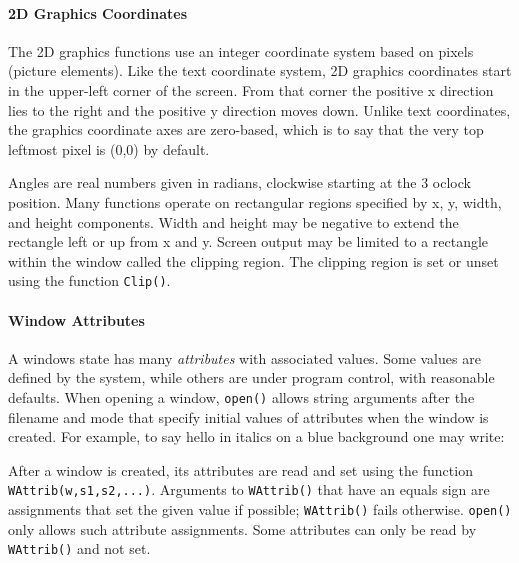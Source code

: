 \paragraph{2D Graphics Coordinates}

The 2D graphics functions use an integer coordinate system based on
pixels (picture elements). Like the text coordinate system, 2D
graphics coordinates start in the upper-left corner of the screen.
From that corner the positive x direction lies to the right and the
positive y direction moves down. Unlike text coordinates, the
graphics coordinate axes are zero-based, which is to say that the very
top leftmost pixel is (0,0) by default.

Angles are real numbers given in radians, clockwise starting at the 3
o{\textquotesingle}clock position. Many functions operate on
rectangular regions specified by x, y, width, and height components.
Width and height may be negative to extend the rectangle
left or up from x and y. Screen output may be limited to a
rectangle within the window called the clipping region. The
clipping region is set or unset using the function \texttt{Clip()}.

\paragraph{Window Attributes}
A window{\textquotesingle}s state has many \textit{attributes}
with associated values. Some values are defined by the system, while
others are under program control, with reasonable defaults. When
opening a window, \texttt{open()} allows string arguments after the filename
and mode that specify initial values of
attributes when the window is created. For example, to say hello in
italics on a blue background one may write:


After a window is created, its attributes are read and set using
the function \texttt{WAttrib(w,s1,s2,...)}. Arguments to
\texttt{WAttrib()} that have an equals sign are assignments that set
the given value if possible; \texttt{WAttrib()} fails otherwise.
\texttt{open()} only allows such attribute assignments. Some
attributes can only be read by \texttt{WAttrib()} and not set.

